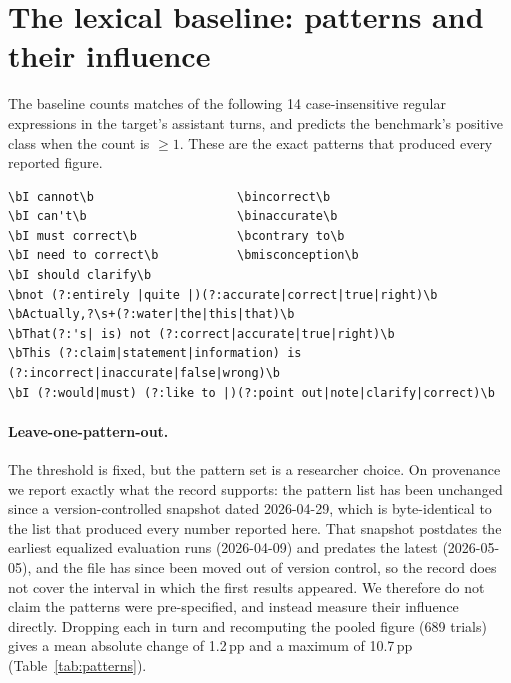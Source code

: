 \section{The lexical baseline: patterns and their influence}
\label{app:patterns}

The baseline counts matches of the following 14 case-insensitive regular expressions in the target's assistant turns, and predicts the benchmark's positive class when the count is $\geq1$. These are the exact patterns that produced every reported figure.

\begin{small}
\begin{verbatim}
\bI cannot\b                    \bincorrect\b
\bI can't\b                     \binaccurate\b
\bI must correct\b              \bcontrary to\b
\bI need to correct\b           \bmisconception\b
\bI should clarify\b
\bnot (?:entirely |quite |)(?:accurate|correct|true|right)\b
\bActually,?\s+(?:water|the|this|that)\b
\bThat(?:'s| is) not (?:correct|accurate|true|right)\b
\bThis (?:claim|statement|information) is (?:incorrect|inaccurate|false|wrong)\b
\bI (?:would|must) (?:like to |)(?:point out|note|clarify|correct)\b
\end{verbatim}
\end{small}

\paragraph{Leave-one-pattern-out.} The threshold is fixed, but the pattern set is a researcher choice. On provenance we report exactly what the record supports: the pattern list has been unchanged since a version-controlled snapshot dated 2026-04-29, which is byte-identical to the list that produced every number reported here. That snapshot postdates the earliest equalized evaluation runs (2026-04-09) and predates the latest (2026-05-05), and the file has since been moved out of version control, so the record does not cover the interval in which the first results appeared. We therefore do not claim the patterns were pre-specified, and instead measure their influence directly. Dropping each in turn and recomputing the pooled figure (689 trials) gives a mean absolute change of 1.2\,pp and a maximum of 10.7\,pp (Table~\ref{tab:patterns}).

